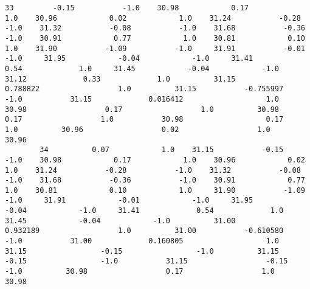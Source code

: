 \documentclass[11pt]{article}
\begin{document}
\begin{Verbatim}[commandchars=\\\{\}]
        33         -0.15           -1.0    30.98            0.17            1.0    30.96            0.02            1.0    31.24           -0.28           -1.0    31.32           -0.08           -1.0    31.68           -0.36           -1.0    30.91            0.77            1.0    30.81            0.10            1.0    31.90           -1.09           -1.0     31.91           -0.01            -1.0     31.95            -0.04            -1.0     31.41             0.54             1.0     31.45            -0.04            -1.0     31.12             0.33             1.0          31.15            0.788822                  1.0          31.15           -0.755997                 -1.0           31.15             0.016412                   1.0          30.98                  0.17                  1.0          30.98                  0.17                  1.0           30.98                   0.17                   1.0          30.96                  0.02                  1.0          30.96   
        34          0.07            1.0    31.15           -0.15           -1.0    30.98            0.17            1.0    30.96            0.02            1.0    31.24           -0.28           -1.0    31.32           -0.08           -1.0    31.68           -0.36           -1.0    30.91            0.77            1.0    30.81            0.10            1.0     31.90           -1.09            -1.0     31.91            -0.01            -1.0     31.95            -0.04            -1.0     31.41             0.54             1.0     31.45            -0.04            -1.0          31.00            0.932189                  1.0          31.00           -0.610580                 -1.0           31.00             0.160805                   1.0          31.15                 -0.15                 -1.0          31.15                 -0.15                 -1.0           31.15                  -0.15                  -1.0          30.98                  0.17                  1.0          30.98   
        

\end{Verbatim}
\end{document}
